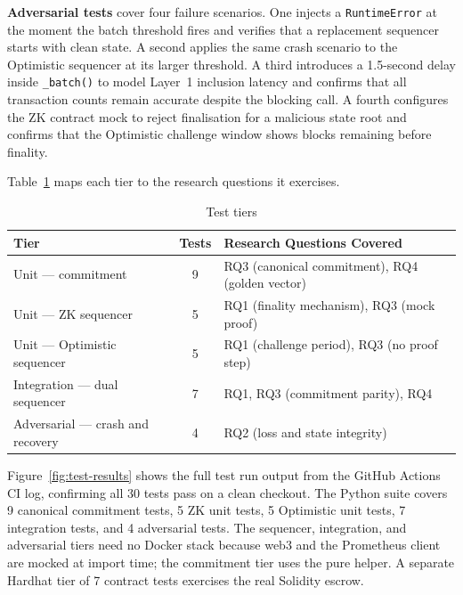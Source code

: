 \textbf{Adversarial tests} cover four failure scenarios. One injects a \texttt{RuntimeError} at the moment the batch threshold fires and verifies that a replacement sequencer starts with clean state. A second applies the same crash scenario to the Optimistic sequencer at its larger threshold. A third introduces a 1.5-second delay inside \texttt{\_batch()} to model Layer~1 inclusion latency and confirms that all transaction counts remain accurate despite the blocking call. A fourth configures the ZK contract mock to reject finalisation for a malicious state root and confirms that the Optimistic challenge window shows blocks remaining before finality.

Table~\ref{tab:test-coverage} maps each tier to the research questions it exercises.

\begin{table}[htbp]
    \centering
    \small
    \setlength{\tabcolsep}{4pt}
    \begin{tabular}{>{\raggedright\arraybackslash}p{3.4cm}|c|>{\raggedright\arraybackslash}p{7.6cm}}
        \hline
        \textbf{Tier} & \textbf{Tests} & \textbf{Research Questions Covered} \\
        \hline
        Unit — commitment & 9 & RQ3 (canonical commitment), RQ4 (golden vector) \\
        \hline
        Unit — ZK sequencer & 5 & RQ1 (finality mechanism), RQ3 (mock proof) \\
        \hline
        Unit — Optimistic sequencer & 5 & RQ1 (challenge period), RQ3 (no proof step) \\
        \hline
        Integration — dual sequencer & 7 & RQ1, RQ3 (commitment parity), RQ4 \\
        \hline
        Adversarial — crash and recovery & 4 & RQ2 (loss and state integrity) \\
        \hline
    \end{tabular}
    \caption{Test tiers}
    \label{tab:test-coverage}
\end{table}

Figure~\ref{fig:test-results} shows the full test run output from the GitHub Actions CI log, confirming all 30 tests pass on a clean checkout. The Python suite covers 9 canonical commitment tests, 5 ZK unit tests, 5 Optimistic unit tests, 7 integration tests, and 4 adversarial tests. The sequencer, integration, and adversarial tiers need no Docker stack because web3 and the Prometheus client are mocked at import time; the commitment tier uses the pure helper. A separate Hardhat tier of 7 contract tests exercises the real Solidity escrow.

